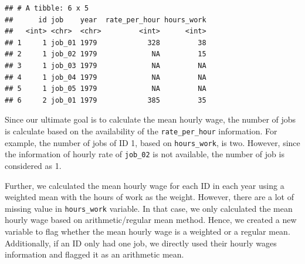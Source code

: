 \documentclass{article}
\begin{document}
\begin{verbatim}
## # A tibble: 6 x 5
##      id job    year  rate_per_hour hours_work
##   <int> <chr>  <chr>         <int>      <int>
## 1     1 job_01 1979            328         38
## 2     1 job_02 1979             NA         15
## 3     1 job_03 1979             NA         NA
## 4     1 job_04 1979             NA         NA
## 5     1 job_05 1979             NA         NA
## 6     2 job_01 1979            385         35
\end{verbatim}

Since our ultimate goal is to calculate the mean hourly wage, the number
of jobs is calculate based on the availability of the
\texttt{rate\_per\_hour} information. For example, the number of jobs of
ID 1, based on \texttt{hours\_work}, is two. However, since the
information of hourly rate of \texttt{job\_02} is not available, the
number of job is considered as 1.

Further, we calculated the mean hourly wage for each ID in each year
using a weighted mean with the hours of work as the weight. However,
there are a lot of missing value in \texttt{hours\_work} variable. In
that case, we only calculated the mean hourly wage based on
arithmetic/regular mean method. Hence, we created a new variable to flag
whether the mean hourly wage is a weighted or a regular mean.
Additionally, if an ID only had one job, we directly used their hourly
wages information and flagged it as an arithmetic mean.
\end{document}
